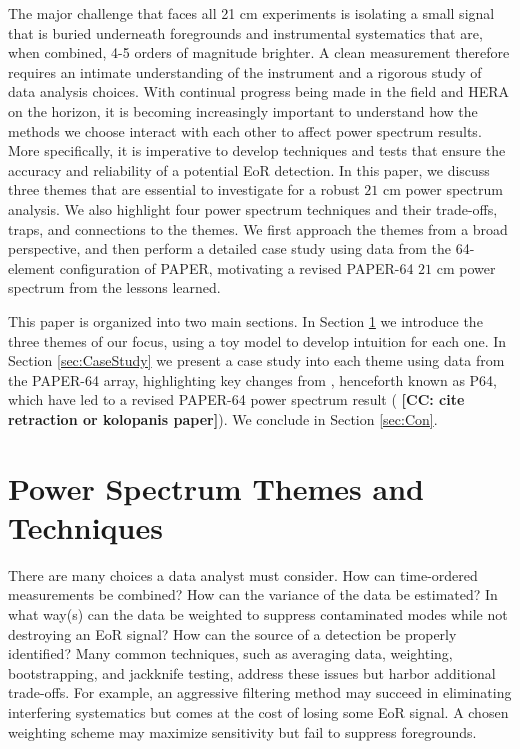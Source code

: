 \documentclass[preprint2,numberedappendix,tighten]{aastex6}  %
\newcommand{\cc}[1]{{\color{purple} \textbf{[CC: #1]}}}
\begin{document}
The major challenge that faces all 21 cm experiments is isolating a small signal that is buried underneath foregrounds and instrumental systematics that are, when combined, 4-5 orders of magnitude brighter. A clean measurement therefore requires an intimate understanding of the instrument and a rigorous study of data analysis choices. With continual progress being made in the field and HERA on the horizon, it is becoming increasingly important to understand how the methods we choose interact with each other to affect power spectrum results. More specifically, it is imperative to develop techniques and tests that ensure the accuracy and reliability of a potential EoR detection. In this paper, we discuss three themes that are essential to investigate for a robust $21$ cm power spectrum analysis. We also highlight four power spectrum techniques and their trade-offs, traps, and connections to the themes. We first approach the themes from a broad perspective, and then perform a detailed case study using data from the 64-element configuration of PAPER, motivating a revised PAPER-64 $21$ cm power spectrum from the lessons learned.

This paper is organized into two main sections. In Section \ref{sec:Themes} we introduce the three themes of our focus, using a toy model to develop intuition for each one. In Section \ref{sec:CaseStudy} we present a case study into each theme using data from the PAPER-64 array, highlighting key changes from \citet{ali_et_al2015}, henceforth known as P64, which have led to a revised PAPER-64 power spectrum result (\cc{cite retraction or kolopanis paper}). We conclude in Section \ref{sec:Con}.


\section{Power Spectrum Themes and Techniques}
\label{sec:Themes}

There are many choices a data analyst must consider. How can time-ordered measurements be combined? How can the variance of the data be estimated? In what way(s) can the data be weighted to suppress contaminated modes while not destroying an EoR signal? How can the source of a detection be properly identified? Many common techniques, such as averaging data, weighting, bootstrapping, and jackknife testing, address these issues but harbor additional trade-offs. For example, an aggressive filtering method may succeed in eliminating interfering systematics but comes at the cost of losing some EoR signal. A chosen weighting scheme may maximize sensitivity but fail to suppress foregrounds. 
\end{document}
